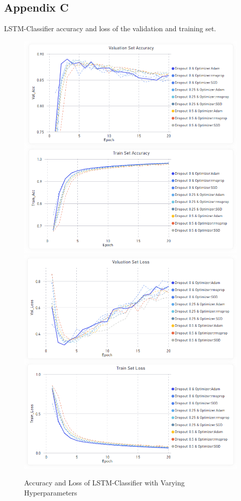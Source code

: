 \documentclass[11pt, a4paper]{article}
\begin{document}
\newpage
\subsection{Appendix C}
LSTM-Classifier accuracy and loss of the validation and training set.
\label{appendix:LSTM_Sentiment_Classifier}
\begin{figure}[!h]
    \centering
    \includegraphics[scale=0.43]{LSTM_Accuracy.png}
    \includegraphics[scale=0.43]{LSTM_Loss.png}
    \caption{Accuracy and Loss of LSTM-Classifier with Varying Hyperparameters}
    \label{fig:lstm_acc_loss}
\end{figure}
\end{document}
